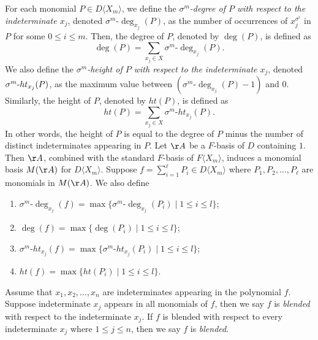 \documentclass{cimart}
\begin{document}
For each monomial $P\in D\langle X_m\rangle$, we define the \textit{$\sigma^m$-degree of $P$ with respect to the indeterminate $x_j$}, denoted $\sigma^m$-$\deg_{x_j}(P)$, as the number of occurrences of $x_j^{\sigma^i}$ in $P$ for some $0\leq i\leq m$. Then, the degree of $P$, denoted by $\deg(P)$, is defined as
\[
\deg(P)=\sum_{x_j\in X}\sigma^m\text{-}\deg_{x_j}(P).
\]
We also define the \textit{$\sigma^m$-height of $P$ with respect to the indeterminate $x_j$}, denoted $\sigma^m\text-ht_{x_j}(P)$, as the maximum value between $(\sigma^m\text{-}\deg_{x_j}(P)-1)$ and $0$. Similarly, the height of $P$, denoted by $ht(P)$, is defined as
\[
ht(P)=\sum_{x_j\in X}\sigma^m\text{-}ht_{x_j}(P).
\]
In other words, the height of $P$ is equal to the degree of $P$ minus the number of distinct indeterminates appearing in $P$. Let $\AA$ be a $F$-basis of $D$ containing $1$.  Then $\AA$, combined with the standard $F$-basis of $F\langle X_m\rangle$, induces a monomial basis $M(\AA)$ for $D\langle X_m\rangle$. Suppose $f=\sum_{i=1}^\ell P_i\in D\langle X_m\rangle$ where $P_1, P_2,\dots,P_\ell$ are monomials in $M(\AA)$. We also define
\begin{enumerate}
	\item $\sigma^m\text{-}\deg_{x_j}(f)=\max\{\sigma^m\text{-}\deg_{x_j}(P_i)\mid 1\leq i\leq l\}$;
	\item $\deg(f)=\max\{\deg(P_i)\mid 1\leq i\leq l\}$;
	\item $\sigma^m\text{-}ht_{x_j}(f)=\max\{\sigma^m\text{-}ht_{x_j}(P_i)\mid 1\leq i\leq l\}$;
	\item $ht(f)=\max\{ht(P_i)\mid 1\leq i\leq l\}$.
\end{enumerate}

Assume that $x_1,x_2,\dots,x_n$ are indeterminates appearing in the polynomial $f$. Suppose indeterminate $x_j$ appears in all monomials of $f$, then we say $f$ is \textit{blended} with respect to the indeterminate $x_j$. If $f$ is blended with respect to every indeterminate $x_j$ where $1\leq j\leq n$, then we say $f$ is \textit{blended}.
\end{document}
